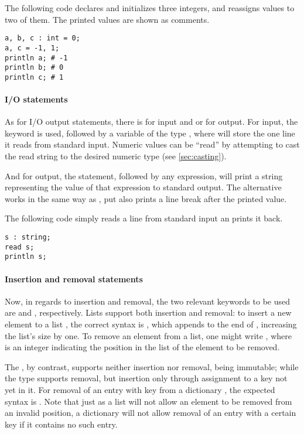 The following code declares and initializes three integers, and reassigns values to two of them. The printed values are shown as comments.
\begin{lstlisting}[language=Gryph]
a, b, c : int = 0;
a, c = -1, 1;
println a; # -1
println b; # 0
println c; # 1
\end{lstlisting}

\paragraph{I/O statements}
\label{sec:io}

As for I/O output statements, there is  for input and  or  for output. For input, the  keyword is used, followed by a variable of the type , where  will store the one line it reads from standard input. Numeric values can be ``read'' by attempting to cast the read string to the desired numeric type (see \autoref{sec:casting}).

And for output, the  statement, followed by any expression, will print a string representing the value of that expression to standard output. The  alternative works in the same way as , put also prints a line break after the printed value.

The following code simply reads a line from standard input an prints it back.
\begin{lstlisting}[language=Gryph]
s : string;
read s;
println s;
\end{lstlisting}

\paragraph{Insertion and removal statements}
\label{sec:add-del}
Now, in regards to insertion and removal, the two relevant keywords to be used are  and , respectively. Lists support both insertion and removal: to insert a new element  to a list , the correct syntax is    , which appends  to the end of , increasing the list's size by one. To remove an element from a list, one might write    , where  is an integer indicating the position in the list of the element to be removed.

The , by contrast, supports neither insertion nor removal, being immutable; while the  type supports removal, but insertion only through assignment to a key not yet in it. For removal of an entry with key  from a dictionary , the expected syntax is    . Note that just as a list will not allow an element to be removed from an invalid position, a dictionary will not allow removal of an entry with a certain key if it contains no such entry.

